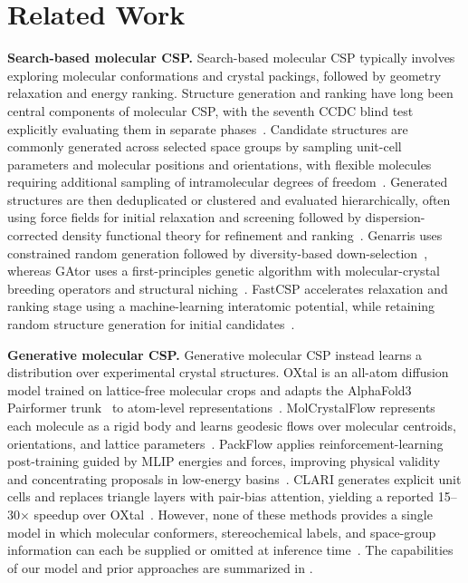 \section{Related Work}

\textbf{Search-based molecular CSP.}
Search-based molecular CSP typically involves exploring molecular conformations and crystal packings, followed by geometry relaxation and energy ranking. Structure generation and ranking have long been central components of molecular CSP, with the seventh CCDC blind test explicitly evaluating them in separate phases~\citep{reilly2016sixth,hunnisett2024seventhranking,hunnisett2024seventhgeneration}. Candidate structures are commonly generated across selected space groups by sampling unit-cell parameters and molecular positions and orientations, with flexible molecules requiring additional sampling of intramolecular degrees of freedom~\citep{day2009significant,reilly2016sixth}. Generated structures are then deduplicated or clustered and evaluated hierarchically, often using force fields for initial relaxation and screening followed by dispersion-corrected density functional theory for refinement and ranking~\citep{beran2023frontiers,hunnisett2024seventhranking}. Genarris uses constrained random generation followed by diversity-based down-selection~\citep{li2018genarris}, whereas GAtor uses a first-principles genetic algorithm with molecular-crystal breeding operators and structural niching~\citep{curtis2018gator}. FastCSP accelerates relaxation and ranking stage using a machine-learning interatomic potential, while retaining random structure generation for initial candidates~\citep{gharakhanyan2025fastcsp}.

\textbf{Generative molecular CSP.}
Generative molecular CSP instead learns a distribution over experimental crystal
structures. OXtal is an all-atom diffusion model trained on lattice-free molecular
crops and adapts the AlphaFold3 Pairformer trunk~\citep{Abramson2024} to atom-level
representations~\citep{jin2025oxtal}. MolCrystalFlow represents each molecule as a
rigid body and learns geodesic flows over molecular centroids, orientations, and
lattice parameters~\citep{zeng2026molcrystalflow}. PackFlow applies
reinforcement-learning post-training guided by MLIP energies and forces, improving
physical validity and concentrating proposals in low-energy
basins~\citep{subramanian2026packflow}. CLARI generates explicit unit cells and
replaces triangle layers with pair-bias attention, yielding a reported
15--30$\times$ speedup over OXtal~\citep{lo2026clari}. However, none of these
methods provides a single model in which molecular conformers, stereochemical
labels, and space-group information can each be supplied or omitted at inference
time~\citep{jin2025oxtal,lo2026clari,subramanian2026packflow,
zeng2026molcrystalflow}. The capabilities of our model and prior approaches are
summarized in .

